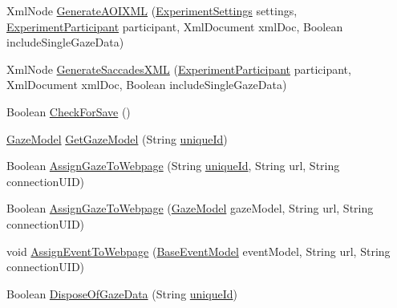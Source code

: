 \begin{DoxyCompactItemize}
\item 
Xml\+Node \hyperlink{class_web_analyzer_1_1_models_1_1_data_model_1_1_test_model_a5fbd82aef3cf27ecf196f7daff4422da}{Generate\+A\+O\+I\+X\+M\+L} (\hyperlink{class_web_analyzer_1_1_models_1_1_settings_model_1_1_experiment_settings}{Experiment\+Settings} settings, \hyperlink{class_web_analyzer_1_1_models_1_1_base_1_1_experiment_participant}{Experiment\+Participant} participant, Xml\+Document xml\+Doc, Boolean include\+Single\+Gaze\+Data)
\item 
Xml\+Node \hyperlink{class_web_analyzer_1_1_models_1_1_data_model_1_1_test_model_a07fd0a4cf43fd9c9dfca89d0583e4609}{Generate\+Saccades\+X\+M\+L} (\hyperlink{class_web_analyzer_1_1_models_1_1_base_1_1_experiment_participant}{Experiment\+Participant} participant, Xml\+Document xml\+Doc, Boolean include\+Single\+Gaze\+Data)
\item 
Boolean \hyperlink{class_web_analyzer_1_1_models_1_1_data_model_1_1_test_model_abc6d6772659bfd91a6d1fe6923ca7a2b}{Check\+For\+Save} ()
\item 
\hyperlink{class_web_analyzer_1_1_models_1_1_data_model_1_1_gaze_model}{Gaze\+Model} \hyperlink{class_web_analyzer_1_1_models_1_1_data_model_1_1_test_model_a276585c6c2bdca3cf99058e2287636dc}{Get\+Gaze\+Model} (String \hyperlink{_u_i_2_h_t_m_l_resources_2js_2lib_2underscore_8min_8js_af690ff5521d79c7128861033ae80ae17}{unique\+Id})
\item 
Boolean \hyperlink{class_web_analyzer_1_1_models_1_1_data_model_1_1_test_model_acb4622f0eb7451a866e94a8b29f13510}{Assign\+Gaze\+To\+Webpage} (String \hyperlink{_u_i_2_h_t_m_l_resources_2js_2lib_2underscore_8min_8js_af690ff5521d79c7128861033ae80ae17}{unique\+Id}, String url, String connection\+U\+I\+D)
\item 
Boolean \hyperlink{class_web_analyzer_1_1_models_1_1_data_model_1_1_test_model_adc538734c53c98df870c6cfee0fa6fb3}{Assign\+Gaze\+To\+Webpage} (\hyperlink{class_web_analyzer_1_1_models_1_1_data_model_1_1_gaze_model}{Gaze\+Model} gaze\+Model, String url, String connection\+U\+I\+D)
\item 
void \hyperlink{class_web_analyzer_1_1_models_1_1_data_model_1_1_test_model_ad533cefe778bc7d604862cf9efeb70b1}{Assign\+Event\+To\+Webpage} (\hyperlink{class_web_analyzer_1_1_models_1_1_event_model_1_1_base_event_model}{Base\+Event\+Model} event\+Model, String url, String connection\+U\+I\+D)
\item 
Boolean \hyperlink{class_web_analyzer_1_1_models_1_1_data_model_1_1_test_model_a4e84c40eeb26adae1fcacc4ffc291d2f}{Dispose\+Of\+Gaze\+Data} (String \hyperlink{_u_i_2_h_t_m_l_resources_2js_2lib_2underscore_8min_8js_af690ff5521d79c7128861033ae80ae17}{unique\+Id})

\end{DoxyCompactItemize}
